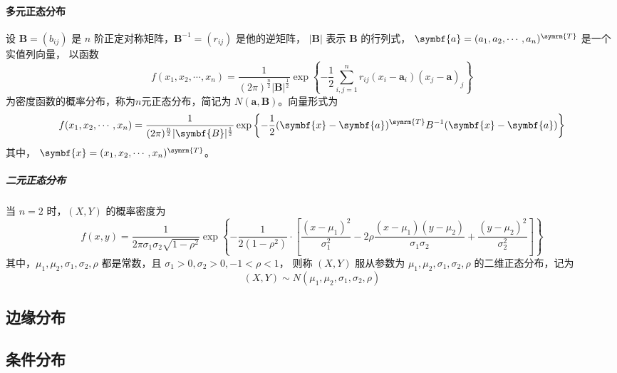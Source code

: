 \paragraph{多元正态分布} 设 $ \symbf{B} = (b_{ij}) $ 是 $ n $ 阶正定对称矩阵，$ \symbf{B}^{-1} = (r_{ij}) $ 是他的逆矩阵，
$ |\symbf{B}| $ 表示 $ \symbf{B} $ 的行列式， $ \symbf{a} = (a_{1} , a_{2} , \cdots , a_{n})^{\symrm{T}} $ 是一个实值列向量，
以函数
\begin{equation}
    f(x_{1}, x_{2}, \cdots, x_{n} ) = \frac{1}{(2\pi)^{\frac{n}{2}} |\symbf{B}|^{\frac{1}{2}}}
    \exp \left\{ -\frac{1}{2} \sum_{i,j=1}^n r_{ij} (x_i - \symbf{a}_i)(x_j - \symbf{a})_j \right\}
\end{equation}
为密度函数的概率分布，称为$ n $元正态分布，简记为 $ N(\symbf{a},\symbf{B}) $。向量形式为
\begin{equation}
    f(x_{1}, x_{2}, \cdots, x_{n} ) = \frac{1}{(2\pi)^{\frac{n}{2}} |\symbf{B}|^{\frac{1}{2}}}
    \exp \left\{ -\frac{1}{2} (\symbf{x} - \symbf{a})^{\symrm{T}} B^{-1} (\symbf{x} - \symbf{a}) \right\}
\end{equation}
其中， $ \symbf{x} = (x_{1}, x_{2}, \cdots, x_{n})^{\symrm{T}} $。

\subparagraph{二元正态分布} 当 $ n=2 $ 时，$ (X,Y) $ 的概率密度为
\begin{equation}
    f(x,y) = \frac{1}{2\pi \sigma_1 \sigma_2 \sqrt{1-\rho^2}}
    \exp \left\{ -\frac{1}{2(1-\rho^2)} \cdot
    \left[ \frac{(x-\mu_1)^2}{\sigma_1^2} -2\rho \frac{(x-\mu_1)(y-\mu_2)}{\sigma_1\sigma_2} + \frac{(y-\mu_2)^2}{\sigma_2^2} \right]
    \right\}
\end{equation}
其中，$ \mu_1, \mu_2, \sigma_1, \sigma_2, \rho $ 都是常数，且 $ \sigma_1 > 0, \sigma_2 > 0, -1 < \rho < 1 $，
则称 $ (X,Y) $ 服从参数为 $ \mu_1, \mu_2, \sigma_1, \sigma_2, \rho $ 的二维正态分布，记为
$$ (X,Y) \sim N(\mu_1, \mu_2, \sigma_1, \sigma_2, \rho) $$

\subsection{边缘分布}

\subsection{条件分布}